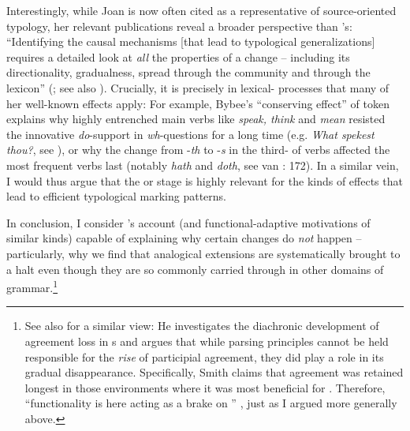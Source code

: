 \documentclass[output=paper]{langsci/langscibook}
\begin{document}
Interestingly, while Joan  is now often cited as a representative of source-oriented typology, her relevant publications reveal a broader perspective than ’s: “Identifying the causal mechanisms [that lead to typological generalizations] requires a detailed look at \textit{all} the properties of a change – including its directionality, gradualness, spread through the community and through the lexicon” (\citealt[108]{Bybee2008_StructPres}; see also \citealt{Bybee1988_Diachr}). Crucially, it is precisely in lexical- processes that many of her well-known  effects apply: For example, Bybee’s “conserving effect” of token  explains why highly entrenched main verbs like \textit{speak, think} and \textit{mean} resisted the innovative \textit{do}{}-support in \textit{wh}{}-questions for a long time (e.g. \textit{What spekest thou?}, see \citealt{Ogura1993_do}), or why the change from -\textit{th} to -\textit{s} in the third- of  verbs affected the most frequent verbs last (notably \textit{hath} and \textit{doth}, see van \citealt{Gelderen2014_Hist}: 172). In a similar vein, I would thus argue that the  or  stage is highly relevant for the kinds of effects that lead to efficient typological marking patterns. 

In conclusion, I consider ’s account (and functional-adaptive motivations of similar kinds) capable of explaining why certain changes do \textit{not} happen – particularly, why we find that analogical extensions are systematically brought to a halt even though they are so commonly carried through in other domains of grammar.\footnote{See also \citet{Smith2001_Act} for a similar view: He investigates the diachronic development of agreement loss in  s and argues that while parsing principles cannot be held responsible for the \textit{rise} of participial agreement, they did play a role in its gradual disappearance. Specifically, Smith claims that agreement was retained longest in those environments where it was most beneficial for . Therefore, “functionality is here acting as a brake on ” \citep[214]{Smith2001_Act}, just as I argued more generally above.}
\end{document}
